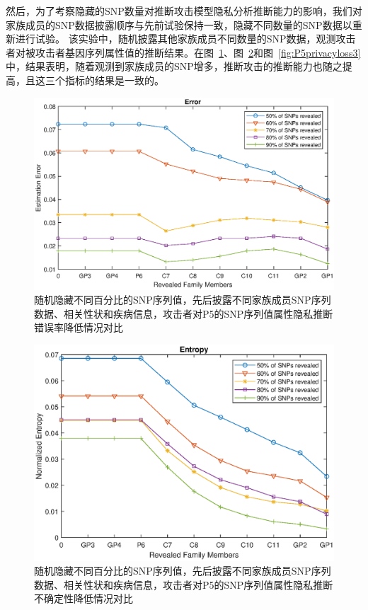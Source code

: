 然后，为了考察隐藏的SNP数量对推断攻击模型隐私分析推断能力的影响，我们对家族成员的SNP数据披露顺序与先前试验保持一致，隐藏不同数量的SNP数据以重新进行试验。 该实验中，随机披露其他家族成员不同数量的SNP数据，观测攻击者对被攻击者基因序列属性值的推断结果。在图~\ref{fig:P5error3}、图~\ref{fig:P5entropy3}和图~\ref{fig:P5privacyloss3}中，结果表明，随着观测到家族成员的SNP增多，推断攻击的推断能力也随之提高，且这三个指标的结果是一致的。

\begin{figure}[htbp]
	\centering
	\includegraphics[width=0.8\linewidth]{./figures/P5error3.eps}
	\centering
	\caption{随机隐藏不同百分比的SNP序列值，先后披露不同家族成员SNP序列数据、相关性状和疾病信息，攻击者对P5的SNP序列值属性隐私推断错误率降低情况对比}\label{fig:P5error3}
\end{figure}


\begin{figure}[htbp]
	\centering
	\includegraphics[width=0.8\linewidth]{./figures/P5entropy3.eps}
	\centering
	\caption{随机隐藏不同百分比的SNP序列值，先后披露不同家族成员SNP序列数据、相关性状和疾病信息，攻击者对P5的SNP序列值属性隐私推断不确定性降低情况对比}\label{fig:P5entropy3}
\end{figure}

